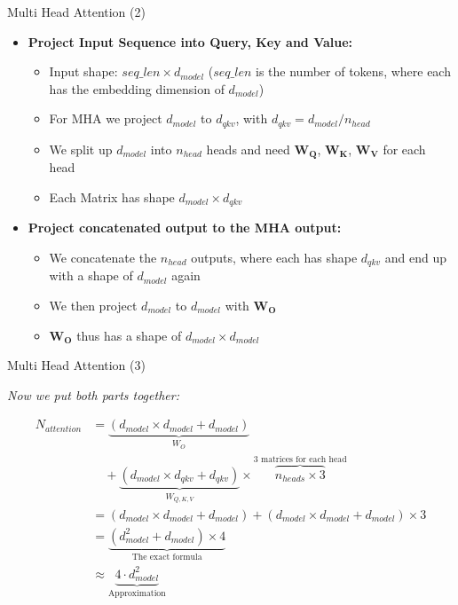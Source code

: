 \begin{frame}{Multi Head Attention (2)}

\begin{itemize}
    \item \textbf{Project Input Sequence into Query, Key and Value:}
        \begin{itemize}
            \item Input shape: $seq\_len\times d_{model}$ ($seq\_len$ is the number of tokens, where each has the embedding dimension of $d_{model}$)
            \item For MHA we project $d_{model}$ to $d_{qkv}$, with $d_{qkv} = d_{model}/n_{head}$ \item We split up $d_{model}$ into $n_{head}$ heads and need $\boldsymbol{W_Q}$, $\boldsymbol{W_K}$, $\boldsymbol{W_V}$ for each head
            \item Each Matrix has shape $d_{model} \times d_{qkv}$
        \end{itemize}
    \vfill
    \item \textbf{Project concatenated output to the MHA output:}
        \begin{itemize}
            \item We concatenate the $n_{head}$ outputs, where each has shape $d_{qkv}$ and end up with a shape of $d_{model}$ again
            \item We then project $d_{model}$ to $d_{model}$ with $\boldsymbol{W_O}$
            \item $\boldsymbol{W_O}$ thus has a shape of $d_{model} \times d_{model}$
        \end{itemize}
\end{itemize}
    
\end{frame}


\begin{frame}{Multi Head Attention (3)}

\textit{Now we put both parts together:}

$$
\begin{aligned}
N_{attention} &= \underbrace{(d_{model} \times d_{model} + d_{model})}_{W_O} \\
&\quad + \underbrace{(d_{model} \times d_{qkv} + d_{qkv})}_{W_{Q,K,V}} \times \overbrace{n_{heads} \times 3}^{\text{3 matrices for each head}} \\
&= (d_{model} \times d_{model} + d_{model}) + (d_{model} \times d_{model} + d_{model}) \times 3 \\
&= \underbrace{(d_{model}^2 + d_{model}) \times 4}_{\text{The exact formula}} \\
&\approx \underbrace{4 \cdot d_{model}^2}_{\text{Approximation}}
\end{aligned}
$$

\end{frame}


